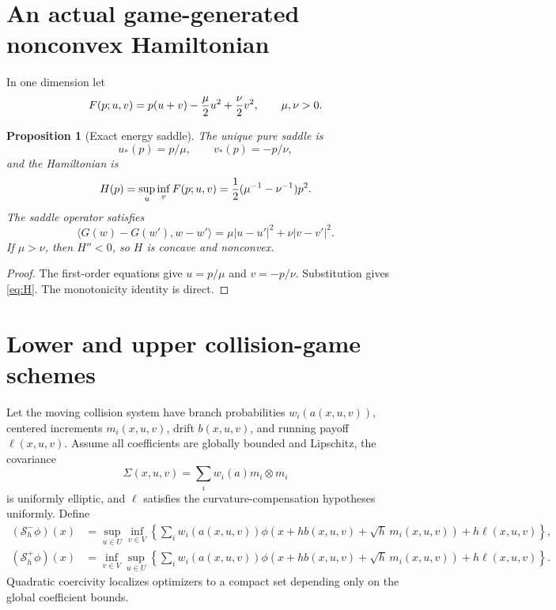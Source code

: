 \documentclass[11pt,reqno]{amsart}
\newtheorem{proposition}[theorem]{Proposition}
\theoremstyle{definition}
\theoremstyle{remark}
\newcommand{\abs}[1]{\left\lvert #1\right\rvert}
\begin{document}
\section{An actual game-generated nonconvex Hamiltonian}

In one dimension let
\begin{equation}\label{eq:quadratic}
 F(p;u,v)=p(u+v)-{\mu\over2}u^2+{\nu\over2}v^2,
 \qquad \mu,\nu>0.
\end{equation}

\begin{proposition}[Exact energy saddle]\label{prop:saddle}
The unique pure saddle is
\[
 u_*(p)=p/\mu,\qquad v_*(p)=-p/\nu,
\]
and the Hamiltonian is
\begin{equation}\label{eq:H}
 H(p)=\sup_u\inf_vF(p;u,v)
 ={1\over2}(\mu^{-1}-\nu^{-1})p^2.
\end{equation}
The saddle operator satisfies
\[
 \langle G(w)-G(w'),w-w'\rangle
 =\mu\abs{u-u'}^2+\nu\abs{v-v'}^2.
\]
If $\mu>\nu$, then $H''<0$, so $H$ is concave and nonconvex.
\end{proposition}

\begin{proof}
The first-order equations give $u=p/\mu$ and $v=-p/\nu$.  Substitution gives
\eqref{eq:H}.  The monotonicity identity is direct.
\end{proof}

\section{Lower and upper collision-game schemes}

Let the moving collision system have branch probabilities
$w_i(a(x,u,v))$, centered increments $m_i(x,u,v)$, drift $b(x,u,v)$, and
running payoff $\ell(x,u,v)$.  Assume all coefficients are globally bounded
and Lipschitz, the covariance
\[
 \Sigma(x,u,v)=\sum_iw_i(a)m_i\otimes m_i
\]
is uniformly elliptic, and $\ell$ satisfies the curvature-compensation
hypotheses uniformly.  Define
\begin{align}
 (\mathcal S_h^-\phi)(x)
 &=\sup_{u\in U}\inf_{v\in V}
 \left\{\sum_iw_i(a(x,u,v))
 \phi(x+hb(x,u,v)+\sqrt h\,m_i(x,u,v))
 +h\ell(x,u,v)\right\},\label{eq:lower-scheme}\\
 (\mathcal S_h^+\phi)(x)
 &=\inf_{v\in V}\sup_{u\in U}
 \left\{\sum_iw_i(a(x,u,v))
 \phi(x+hb(x,u,v)+\sqrt h\,m_i(x,u,v))
 +h\ell(x,u,v)\right\}.\label{eq:upper-scheme}
\end{align}
Quadratic coercivity localizes optimizers to a compact set depending only on
the global coefficient bounds.
\end{document}
